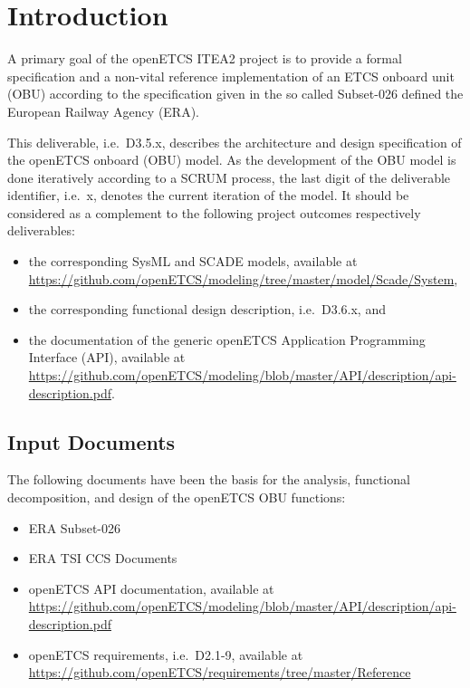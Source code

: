 
\chapter{Introduction}

A primary goal of the openETCS ITEA2 project is to provide a formal specification and a non-vital reference implementation of an ETCS onboard unit (OBU) according to the specification given in the so called Subset-026 \cite{subset-026} defined the European Railway Agency (ERA). 

This deliverable, i.e.~D3.5.x, describes the architecture and design specification of the openETCS onboard (OBU) model. As the development of the OBU model is done iteratively according to a SCRUM process, the last digit of the deliverable identifier, i.e.~x, denotes the current iteration of the model. It should be considered as a complement to the following project outcomes respectively deliverables:
\begin{itemize}
\item the corresponding SysML and SCADE models, available at \url{https://github.com/openETCS/modeling/tree/master/model/Scade/System},
\item the corresponding functional design description, i.e.~D3.6.x, and
\item the documentation of the generic openETCS Application Programming Interface (API), available at \url{https://github.com/openETCS/modeling/blob/master/API/description/api-description.pdf}.
\end{itemize}


\section{Input Documents}

The following documents have been the basis for the analysis, functional decomposition, and design of the openETCS OBU functions:
\begin{itemize}
\item ERA Subset-026 \cite{subset-026}
\item ERA TSI CCS Documents
\item openETCS API documentation, available at \url{https://github.com/openETCS/modeling/blob/master/API/description/api-description.pdf}
\item openETCS requirements, i.e.~D2.1-9, available at \url{https://github.com/openETCS/requirements/tree/master/Reference}
\end{itemize}